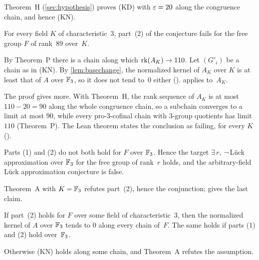 Theorem~H (\cref{sec:hypothesis}) proves (KD) with $\varepsilon=20$ along the congruence chain, and hence (KN).

\begin{theorem}[Theorem A]\label{thm:A}
For every field $K$ of characteristic~$3$, part~(2) of the conjecture fails for the free group $F$ of rank~$89$
over~$K$.
\end{theorem}
\begin{outline}
By Theorem~P there is a chain along which $\operatorname{rk}(A_K)\to110$. Let $(G'_i)$ be a chain as in (KN). By \cref{lem:basechange},
the normalized kernel of $A_K$ over $K$ is at least that of $A$ over $\mathbb{F}_3$, so it does not tend to~$0$ either
().  applies to~$A_K$.
\end{outline}

The proof gives more. With Theorem~H, the rank sequence of $A_K$ is at most $110-20=90$ along the whole congruence
chain, so a subchain converges to a limit at most $90$, while every pro-$3$-cofinal chain with $3$-group quotients has
limit $110$ (Theorem~P). The Lean theorem states the conclusion as  failing, for every
$K$ ().

\begin{corollary}\label{cor:target}
Parts (1) and (2) do not both hold for $F$ over $\mathbb{F}_3$. Hence the target $\exists\,r,\ \neg$\,L\"uck approximation over
$\mathbb{F}_3$ for the free group of rank~$r$ holds, and the arbitrary-field L\"uck approximation conjecture is false.
\end{corollary}
\begin{outline}
Theorem~A with $K=\mathbb{F}_3$ refutes part~(2), hence the conjunction;  gives the last
claim.
\end{outline}

\begin{corollary}\label{cor:unconditional}
If part~(2) holds for $F$ over some field of characteristic~$3$, then the normalized kernel of $A$ over $\mathbb{F}_3$ tends to $0$
along every chain of~$F$. The same holds if parts (1) and (2) hold over~$\mathbb{F}_3$.
\end{corollary}
\begin{outline}
Otherwise (KN) holds along some chain, and Theorem~A refutes the assumption.
\end{outline}

